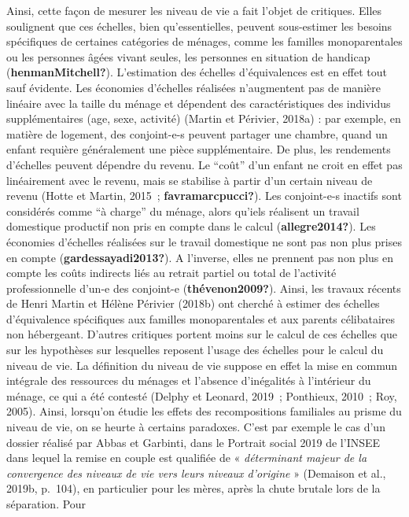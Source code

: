 \documentclass[
  12pt,
]{book}
\begin{document}
Ainsi, cette façon de mesurer les niveau de vie a fait l'objet de
critiques. Elles soulignent que ces échelles, bien qu'essentielles,
peuvent sous-estimer les besoins spécifiques de certaines catégories de
ménages, comme les familles monoparentales ou les personnes âgées vivant
seules, les personnes en situation de handicap
(\textbf{henmanMitchell?}). L'estimation des échelles d'équivalences est
en effet tout sauf évidente. Les économies d'échelles réalisées
n'augmentent pas de manière linéaire avec la taille du ménage et
dépendent des caractéristiques des individus supplémentaires (age, sexe,
activité) (Martin et Périvier, 2018a) : par exemple, en matière de
logement, des conjoint-e-s peuvent partager une chambre, quand un enfant
requière généralement une pièce supplémentaire. De plus, les rendements
d'échelles peuvent dépendre du revenu. Le ``coût'' d'un enfant ne croit
en effet pas linéairement avec le revenu, mais se stabilise à partir
d'un certain niveau de revenu (Hotte et Martin, 2015~;
\textbf{favramarcpucci?}). Les conjoint-e-s inactifs sont considérés
comme ``à charge'' du ménage, alors qu'iels réalisent un travail
domestique productif non pris en compte dans le calcul
(\textbf{allegre2014?}). Les économies d'échelles réalisées sur le
travail domestique ne sont pas non plus prises en compte
(\textbf{gardessayadi2013?}). A l'inverse, elles ne prennent pas non
plus en compte les coûts indirects liés au retrait partiel ou total de
l'activité professionnelle d'un-e des conjoint-e
(\textbf{thévenon2009?}). Ainsi, les travaux récents de Henri Martin et
Hélène Périvier (2018b) ont cherché à estimer des échelles d'équivalence
spécifiques aux familles monoparentales et aux parents célibataires non
hébergeant. D'autres critiques portent moins sur le calcul de ces
échelles que sur les hypothèses sur lesquelles reposent l'usage des
échelles pour le calcul du niveau de vie. La définition du niveau de vie
suppose en effet la mise en commun intégrale des ressources du ménages
et l'absence d'inégalités à l'intérieur du ménage, ce qui a été contesté
(Delphy et Leonard, 2019~; Ponthieux, 2010~; Roy, 2005). Ainsi,
lorsqu'on étudie les effets des recompositions familiales au prisme du
niveau de vie, on se heurte à certains paradoxes. C'est par exemple le
cas d'un dossier réalisé par Abbas et Garbinti, dans le Portrait social
2019 de l'INSEE dans lequel la remise en couple est qualifiée de «
\emph{déterminant majeur de la convergence des niveaux de vie vers leurs
niveaux d'origine} » (Demaison et al., 2019b, p.~104), en particulier
pour les mères, après la chute brutale lors de la séparation. Pour
\end{document}

